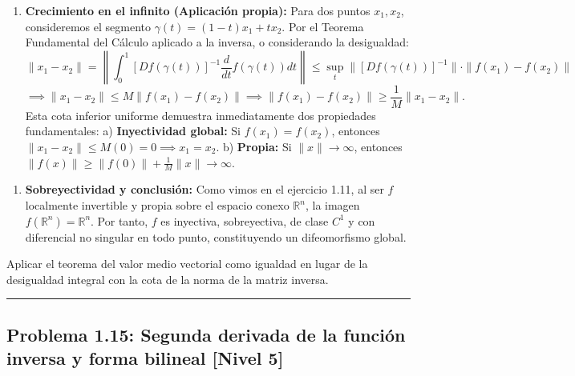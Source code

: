 \documentclass[11pt,a4paper]{article}
\begin{document}
\begin{enumerate}[label=\textbf{\arabic*.}]
\item \textbf{Crecimiento en el infinito (Aplicación propia):}
Para dos puntos $x_1, x_2$, consideremos el segmento $\gamma(t) = (1-t)x_1 + t x_2$.
Por el Teorema Fundamental del Cálculo aplicado a la inversa, o considerando la desigualdad:
\begin{equation*}
\|x_1 - x_2\| = \left\| \int_0^1 [Df(\gamma(t))]^{-1} \frac{d}{dt}f(\gamma(t)) dt \right\| \le \sup_t \|[Df(\gamma(t))]^{-1}\| \cdot \|f(x_1) - f(x_2)\|
\end{equation*}
\begin{equation*}
\implies \|x_1 - x_2\| \le M \|f(x_1) - f(x_2)\| \implies \|f(x_1) - f(x_2)\| \ge \frac{1}{M} \|x_1 - x_2\|.
\end{equation*}
Esta cota inferior uniforme demuestra inmediatamente dos propiedades fundamentales:
a) \textbf{Inyectividad global:} Si $f(x_1) = f(x_2)$, entonces $\|x_1 - x_2\| \le M(0) = 0 \implies x_1 = x_2$.
b) \textbf{Propia:} Si $\|x\| \to \infty$, entonces $\|f(x)\| \ge \|f(0)\| + \frac{1}{M}\|x\| \to \infty$.
\end{enumerate}

\begin{enumerate}[label=\textbf{\arabic*.}]
\item \textbf{Sobreyectividad y conclusión:}
Como vimos en el ejercicio 1.11, al ser $f$ localmente invertible y propia sobre el espacio conexo $\mathbb{R}^n$, la imagen $f(\mathbb{R}^n) = \mathbb{R}^n$.
Por tanto, $f$ es inyectiva, sobreyectiva, de clase $C^1$ y con diferencial no singular en todo punto, constituyendo un difeomorfismo global.
\end{enumerate}

\begin{trapbox}
Aplicar el teorema del valor medio vectorial como igualdad en lugar de la desigualdad integral con la cota de la norma de la matriz inversa.
\end{trapbox}

\vspace{0.5cm}
\hrule
\vspace{0.5cm}

\subsection*{Problema 1.15: Segunda derivada de la función inversa y forma bilineal \hfill \color{primaryblue}\small[Nivel 5]}
\end{document}
